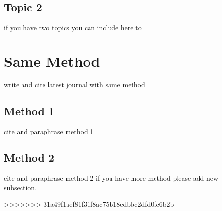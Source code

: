 \subsection{Topic 2}
if you have two topics you can include here to


\section{Same Method}
write and cite latest journal with same method

\subsection{Method 1}
cite and paraphrase method 1

\subsection{Method 2}
cite and paraphrase method 2 if you have more method please add new subsection.

 
>>>>>>> 31a49f1aef81f31f8ac75b18edbbc2dfd0fc6b2b
